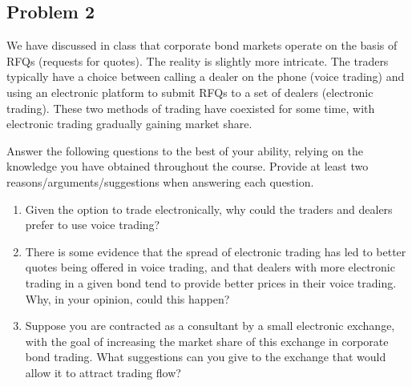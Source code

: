 \quad
\subsection*{Problem 2}
	We have discussed in class that corporate bond markets operate on the basis of RFQs (requests for quotes). The reality is slightly more intricate. The traders typically have a choice between calling a dealer on the phone (voice trading) and using an electronic platform to submit RFQs to a set of dealers (electronic trading). These two methods of trading have coexisted for some time, with electronic trading gradually gaining market share. 
	
	Answer the following questions to the best of your ability, relying on the knowledge you have obtained throughout the course. Provide at least two reasons/arguments/suggestions when answering each question.
	
	\begin{enumerate}
		\item 
		Given the option to trade electronically, why could the traders and dealers prefer to use voice trading?
		
		\item 
		There is some evidence that the spread of electronic trading has led to better quotes being offered in voice trading, and that dealers with more electronic trading in a given bond tend to provide better prices in their voice trading. Why, in your opinion, could this happen?
		
		\item 
		Suppose you are contracted as a consultant by a small electronic exchange, with the goal of increasing the market share of this exchange in corporate bond trading. What suggestions can you give to the exchange that would allow it to attract trading flow?
	\end{enumerate}


